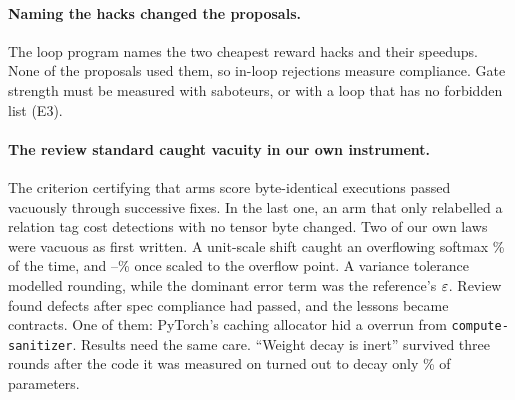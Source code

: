 \paragraph{Naming the hacks changed the proposals.}
The loop program names the two cheapest reward hacks and their speedups. None of the
\loopCandidates{} proposals used them, so in-loop rejections measure compliance. Gate
strength must be measured with saboteurs, or with a loop that has no forbidden list (E3).

\paragraph{The review standard caught vacuity in our own instrument.}
The criterion certifying that arms score byte-identical executions passed vacuously
through \fairnessLayers{} successive fixes. In the last one, an arm that only relabelled
a relation tag cost \relabelLoss{} detections with no tensor byte changed. Two of our own
laws were vacuous as first written. A unit-scale shift caught an overflowing softmax
\shiftUnitCatch\% of the time, and \shiftScaledCatchLo--\shiftScaledCatchHi\% once scaled
to the overflow point. A variance tolerance modelled rounding, while the dominant error
term was the reference's $\varepsilon$. Review found \reviewDefects{} defects after spec
compliance had passed, and the lessons became contracts. One of them: PyTorch's caching
allocator hid a \sanitizerOverrun{} overrun from \texttt{compute-\allowbreak sanitizer}. Results need
the same care. ``Weight decay is inert'' survived three rounds after the code it was
measured on turned out to decay only \wdCoverage\% of parameters.
